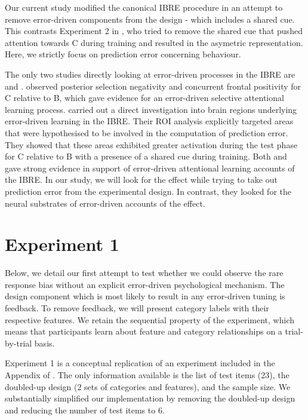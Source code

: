 \documentclass[10pt,letterpaper]{article}
\begin{document}
Our current study modified the canonical IBRE procedure in an attempt to remove error-driven components from the design - which includes a shared cue.
This contrasts Experiment 2 in , who tried to remove the shared cue that pushed attention towards C during training and resulted in the asymetric representation.
Here, we strictly focus on prediction error concerning behaviour.

The only two studies directly looking at error-driven processes in the IBRE are  and .
 observed posterior selection negativity and concurrent frontal positivity for C relative to B, which gave evidence for an error-driven selective attentional learning process.
 carried out a direct investigation into brain regions underlying error-driven learning in the IBRE.
Their ROI analysis explicitly targeted areas that were hypothesised to be involved in the computation of prediction error.
They showed that these areas exhibited greater activation during the test phase for C relative to B with a presence of a shared cue during training.
Both  and  gave strong evidence in support of error-driven attentional learning accounts of the IBRE.
In our study, we will look for the effect while trying to take out prediction error from the experimental design.
In contrast, they looked for the neural substrates of error-driven accounts of the effect.

\section{Experiment 1}

Below, we detail our first attempt to test whether we could observe the rare response bias without an explicit error-driven psychological mechanism.
The design component which is most likely to result in any error-driven tuning is feedback.
To remove feedback, we will present category labels with their respective features.
We retain the sequential property of the experiment, which means that participants learn about feature and category relationships on a trial-by-trial basis.

Experiment 1 is a conceptual replication of an experiment included in the Appendix of .
The only information available is the list of test items (23), the doubled-up design (2 sets of categories and features), and the sample size.
We substantially simplified our implementation by removing the doubled-up design and reducing the number of test items to 6.
\end{document}
